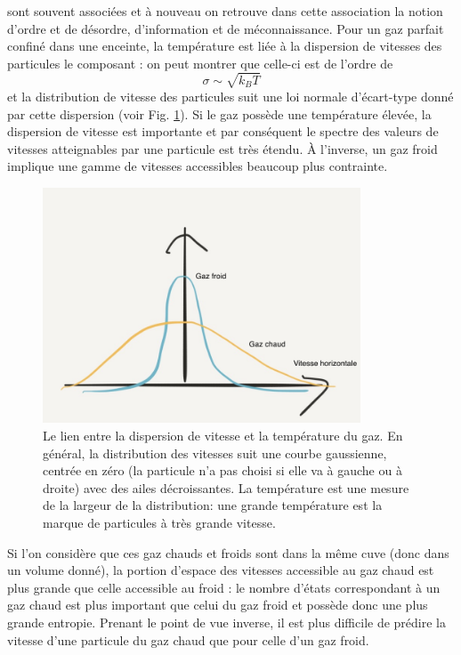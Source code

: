  sont souvent associées et à nouveau on retrouve dans cette association la notion d'ordre et de désordre, d'information et de méconnaissance. Pour un gaz parfait confiné dans une enceinte, la température est liée à la dispersion de vitesses des particules le composant : on peut montrer que celle-ci est de l'ordre de
\begin{equation}
\sigma \sim \sqrt{k_B T}
\end{equation}
et la distribution de vitesse des particules suit une loi normale d'écart-type donné par cette dispersion (voir Fig. \ref{f:disp}). Si le gaz possède une température élevée, la dispersion de vitesse est importante et par conséquent le spectre des valeurs de vitesses atteignables par une particule est très étendu. À l'inverse, un gaz froid implique une gamme de vitesses accessibles beaucoup plus contrainte.
\begin{figure}[htbp]
	\centering
		\includegraphics[height=7cm]{figs/dispersion.png}
	\caption[Le lien entre la dispersion de vitesse et la température du gaz. ]{Le lien entre la dispersion de vitesse et la température du gaz. En général, la distribution des vitesses suit une courbe gaussienne, centrée en zéro (la particule n'a pas choisi si elle va à gauche ou à droite) avec des ailes décroissantes. La température est une mesure de la largeur de la distribution: une grande température est la marque de particules à très grande vitesse.}
	\label{f:disp}
\end{figure}
Si l’on considère que ces gaz chauds et froids sont dans la même cuve (donc dans un volume donné), la portion d'espace des vitesses accessible au gaz chaud est plus grande que celle accessible au froid : le nombre d'états correspondant à un gaz chaud est plus important que celui du gaz froid et possède donc une plus grande entropie. Prenant le point de vue inverse, il est plus difficile de prédire la vitesse d'une particule du gaz chaud que pour celle d'un gaz froid. 

